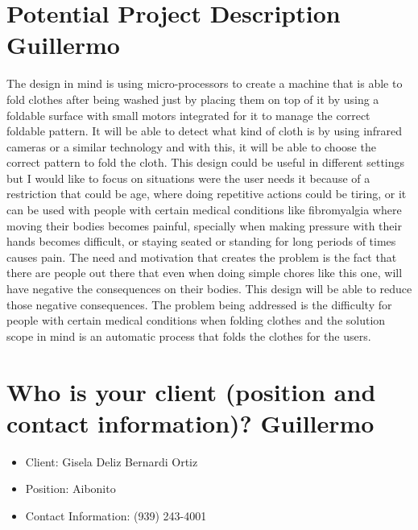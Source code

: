 \section{Potential Project Description Guillermo}

The design in mind is using micro-processors to create a machine that is able to fold clothes after being washed just by placing them on top of it by using a foldable surface with small motors integrated for it to manage the correct foldable pattern. It will be able to detect what kind of cloth is by using infrared cameras or a similar technology and with this, it will be able to choose the correct pattern to fold the cloth.  This design could be useful in different settings but I would like to focus on situations were the user needs it because of a restriction that could be age, where doing repetitive actions could be tiring, or it can be used with people with certain medical conditions like fibromyalgia where moving their bodies becomes painful, specially when making pressure with their hands becomes difficult, or staying seated or standing for long periods of times causes pain. The need  and motivation that creates the problem is the fact that there are people out there that even when doing simple chores like this one, will have negative the consequences on their bodies. This design will be able to reduce those negative consequences. The problem being addressed is the difficulty for people with certain medical conditions when folding clothes and the solution scope in mind is an automatic process that folds the clothes for the users.

\newpage
\section{Who is your client (position and contact information)? Guillermo}
\begin{itemize}
\item Client: Gisela Deliz Bernardi Ortiz
\item Position: Aibonito
\item Contact Information: (939) 243-4001
\end{itemize}
